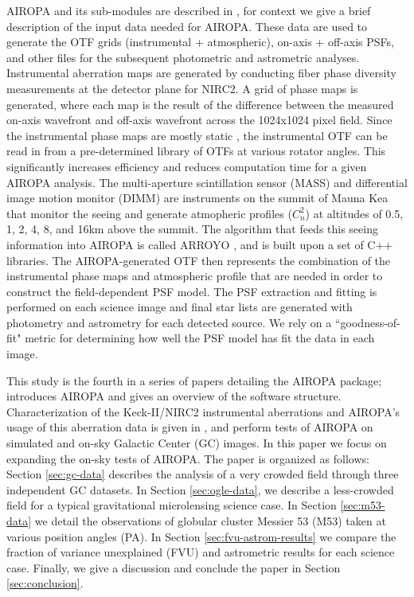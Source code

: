 \documentclass[]{spie}  %
\begin{document}
\indent AIROPA and its sub-modules are described in \cite{witzel:2016a}, for context we give a brief description of the input data needed for AIROPA. These data are used to generate the OTF grids (instrumental + atmospheric), on-axis + off-axis PSFs, and other files for the subsequent photometric and astrometric analyses. Instrumental aberration maps are generated by conducting fiber phase diversity measurements at the detector plane for NIRC2. A grid of phase maps is generated, where each map is the result of the difference between the measured on-axis wavefront and off-axis wavefront across the 1024x1024 pixel field. Since the instrumental phase maps are mostly static \citep{Ciurlo:inprep}, the instrumental OTF can be read in from a pre-determined library of OTFs at various rotator angles. This significantly increases efficiency and reduces computation time for a given AIROPA analysis. The multi-aperture scintillation sensor (MASS) and differential image motion monitor (DIMM) are instruments on the summit of Mauna Kea that monitor the seeing and generate atmopheric profiles ($C_n^{2}$) at altitudes of 0.5, 1, 2, 4, 8, and 16km above the summit. The algorithm that feeds this seeing information into AIROPA is called ARROYO \citep{britton:2006a}, and is built upon a set of C++ libraries. The AIROPA-generated OTF then represents the combination of the instrumental phase maps and atmospheric profile that are needed in order to construct the field-dependent PSF model. The PSF extraction and fitting is performed on each science image and final star lists are generated with photometry and astrometry for each detected source. We rely on a ``goodness-of-fit" metric for determining how well the PSF model has fit the data in each image.

\indent This study is the fourth in a series of papers detailing the AIROPA package; \cite{witzel:2016a} introduces AIROPA and gives an overview of the software structure. Characterization of the Keck-II/NIRC2 instrumental aberrations and AIROPA's usage of this aberration data is given in \cite{Ciurlo:inprep}, and \cite{Turri:inprep} perform tests of AIROPA on simulated and on-sky Galactic Center (GC) images. In this paper we focus on expanding the on-sky tests of AIROPA. The paper is organized as follows: Section \ref{sec:gc-data} describes the analysis of a very crowded field through three independent GC datasets. In Section \ref{sec:ogle-data}, we describe a less-crowded field for a typical gravitational microlensing science case. In Section \ref{sec:m53-data} we detail the observations of globular cluster Messier 53 (M53) taken at various position angles (PA). In Section \ref{sec:fvu-astrom-results} we compare the fraction of variance unexplained (FVU) and astrometric results for each science case. Finally, we give a discussion and conclude the paper in Section \ref{sec:conclusion}.
\end{document}
